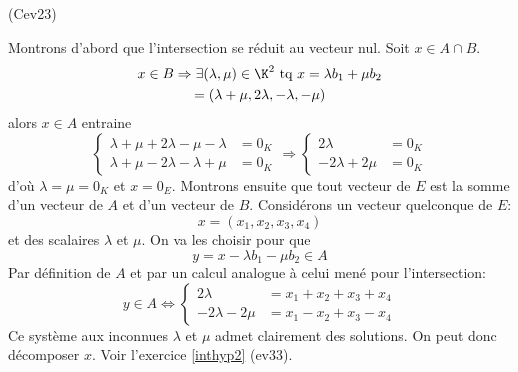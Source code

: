 \begin{tiny}(Cev23)\end{tiny} Montrons d'abord que l'intersection se réduit au vecteur nul. Soit $x\in A\cap B$.
\begin{multline*}
  x \in B \Rightarrow \exists (\lambda,\mu)\in \K^2 \text{ tq } x = \lambda b_1 + \mu b_2\\
  = (\lambda + \mu, 2\lambda, -\lambda,-\mu)
\end{multline*}
alors $x\in A$ entraine
\begin{displaymath}
\left\lbrace 
\begin{aligned}
  \lambda + \mu + 2\lambda -\mu -\lambda &= 0_K \\
  \lambda + \mu - 2\lambda -\lambda + \mu &= 0_K
\end{aligned}
\right. 
\Rightarrow
\left\lbrace 
\begin{aligned}
  2\lambda &= 0_K \\ -2\lambda + 2\mu &= 0_K
\end{aligned}
\right. 
\end{displaymath}
d'où $\lambda=\mu=0_K$ et $x=0_E$.\newline
Montrons ensuite que tout vecteur de $E$ est la somme d'un vecteur de $A$ et d'un vecteur de $B$.
Considérons un vecteur quelconque de $E$:
\begin{displaymath}
  x = (x_1,x_2,x_3,x_4)
\end{displaymath}
et des scalaires $\lambda$ et $\mu$. On va les choisir pour que 
\begin{displaymath}
  y = x -\lambda b_1 - \mu b_2 \in A 
\end{displaymath}
Par définition de $A$ et par un calcul analogue à celui mené pour l'intersection:
\begin{displaymath}
  y \in A \Leftrightarrow
\left\lbrace 
\begin{aligned}
  2\lambda &= x_1+x_2+x_3+x_4 \\
  -2\lambda - 2\mu &= x_1-x_2+x_3-x_4
\end{aligned}
\right. 
\end{displaymath}
Ce système aux inconnues $\lambda$ et $\mu$ admet clairement des solutions. On peut donc décomposer $x$.\newline
Voir l'exercice \ref{inthyp2} (ev33).
